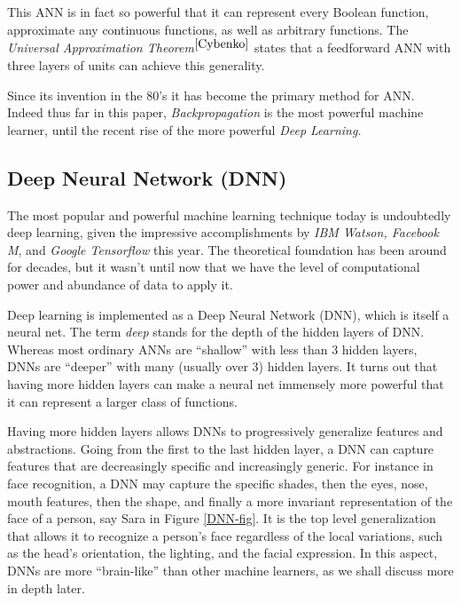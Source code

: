 \documentclass[12pt]{article}  %
\begin{document}
This ANN is in fact so powerful that it can represent every Boolean function, approximate any continuous functions, as well as arbitrary functions. The {\em Universal Approximation Theorem}$^{\ref{Cybenko}}$ states that a feedforward ANN with three layers of units can achieve this generality.

Since its invention in the 80's it has become the primary method for ANN. Indeed thus far in this paper, {\em Backpropagation} is the most powerful machine learner, until the recent rise of the more powerful {\em Deep Learning.}



\subsection{Deep Neural Network (DNN)}

The most popular and powerful machine learning technique today is undoubtedly deep learning, given the impressive accomplishments by \emph{IBM Watson, Facebook M}, and \emph{Google Tensorflow} this year. The theoretical foundation has been around for decades, but it wasn't until now that we have the level of computational power and abundance of data to apply it.

Deep learning is implemented as a Deep Neural Network (DNN), which is itself a neural net. The term \emph{deep} stands for the depth of the hidden layers of DNN. Whereas most ordinary ANNs are ``shallow'' with less than 3 hidden layers, DNNs are ``deeper'' with many (usually over 3) hidden layers. It turns out that having more hidden layers can make a neural net immensely more powerful that it can represent a larger class of functions.


Having more hidden layers allows DNNs to progressively generalize features and abstractions. Going from the first to the last hidden layer, a DNN can capture features that are decreasingly specific and increasingly generic. For instance in face recognition, a DNN may capture the specific shades, then the eyes, nose, mouth features, then the shape, and finally a more invariant representation of the face of a person, say Sara in Figure \ref{DNN-fig}. It is the top level generalization that allows it to recognize a person's face regardless of the local variations, such as the head's orientation, the lighting, and the facial expression. In this aspect, DNNs are more ``brain-like'' than other machine learners, as we shall discuss more in depth later.
\end{document}
